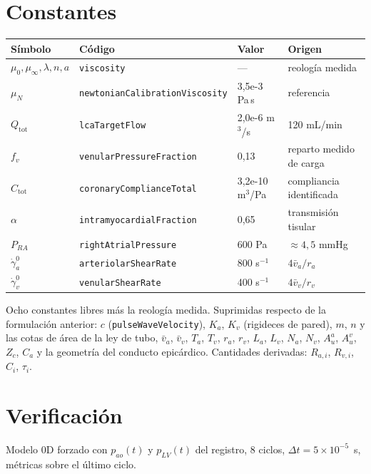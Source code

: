 \documentclass[11pt]{article}
\begin{document}
\section{Constantes}

\begin{center}\small
\begin{tabular}{llll}
\toprule
S\'imbolo & C\'odigo & Valor & Origen\\
\midrule
$\mu_0,\mu_\infty,\lambda,n,a$ & \texttt{viscosity} & --- & reolog\'ia medida\\
$\mu_N$ & \texttt{newtonianCalibrationViscosity} & 3{,}5e-3 Pa\,s & referencia\\
\midrule
$Q_{\text{tot}}$ & \texttt{lcaTargetFlow} & 2{,}0e-6 m$^3$/s & 120 mL/min\\
$f_v$ & \texttt{venularPressureFraction} & 0{,}13 & reparto medido de carga\\
$C_{\text{tot}}$ & \texttt{coronaryComplianceTotal} & 3{,}2e-10 m$^3$/Pa & compliancia identificada\\
$\alpha$ & \texttt{intramyocardialFraction} & 0{,}65 & transmisi\'on tisular\\
$P_{RA}$ & \texttt{rightAtrialPressure} & 600 Pa & $\approx4{,}5$ mmHg\\
$\dot\gamma_a^{0}$ & \texttt{arteriolarShearRate} & 800 s$^{-1}$ & $4\bar v_a/r_a$\\
$\dot\gamma_v^{0}$ & \texttt{venularShearRate} & 400 s$^{-1}$ & $4\bar v_v/r_v$\\
\bottomrule
\end{tabular}
\end{center}

\noindent
Ocho constantes libres m\'as la reolog\'ia medida. Suprimidas respecto de la
formulaci\'on anterior: $c$ (\texttt{pulseWaveVelocity}),
$K_a$, $K_v$ (rigideces de pared), $m$, $n$ y las cotas de \'area de la ley de
tubo, $\bar v_a$, $\bar v_v$, $T_a$, $T_v$, $r_a$, $r_v$, $L_a$, $L_v$,
$N_a$, $N_v$, $A_u^a$, $A_u^v$, $Z_c$, $C_a$ y la geometr\'ia del conducto
epic\'ardico. Cantidades derivadas: $R_{a,i}$, $R_{v,i}$, $C_i$, $\tau_i$.

\section{Verificaci\'on}

Modelo 0D forzado con $p_{ao}(t)$ y $p_{LV}(t)$ del registro, $8$ ciclos,
$\Delta t=5\times10^{-5}$~s, m\'etricas sobre el \'ultimo ciclo.
\end{document}
